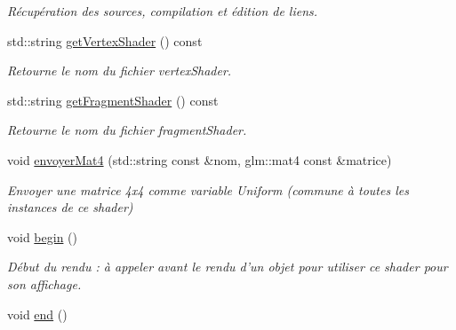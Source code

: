 \begin{DoxyCompactItemize}
\begin{DoxyCompactList}\small\item\em Récupération des sources, compilation et édition de liens. \end{DoxyCompactList}\item 
\hypertarget{classShader_aaa2ce3b8edbb1954b0b627dcb40cff7e}{std\-::string \hyperlink{classShader_aaa2ce3b8edbb1954b0b627dcb40cff7e}{get\-Vertex\-Shader} () const }\label{classShader_aaa2ce3b8edbb1954b0b627dcb40cff7e}

\begin{DoxyCompactList}\small\item\em Retourne le nom du fichier vertex\-Shader. \end{DoxyCompactList}\item 
\hypertarget{classShader_ac5069963469dcac0be6841e73de29aa3}{std\-::string \hyperlink{classShader_ac5069963469dcac0be6841e73de29aa3}{get\-Fragment\-Shader} () const }\label{classShader_ac5069963469dcac0be6841e73de29aa3}

\begin{DoxyCompactList}\small\item\em Retourne le nom du fichier fragment\-Shader. \end{DoxyCompactList}\item 
\hypertarget{classShader_a7caa048bcdc688aba0c691f56bd4c194}{void \hyperlink{classShader_a7caa048bcdc688aba0c691f56bd4c194}{envoyer\-Mat4} (std\-::string const \&nom, glm\-::mat4 const \&matrice)}\label{classShader_a7caa048bcdc688aba0c691f56bd4c194}

\begin{DoxyCompactList}\small\item\em Envoyer une matrice 4x4 comme variable Uniform (commune à toutes les instances de ce shader) \end{DoxyCompactList}\item 
\hypertarget{classShader_acf2af4edd5d98c008b9fd2de3a55c5cf}{void \hyperlink{classShader_acf2af4edd5d98c008b9fd2de3a55c5cf}{begin} ()}\label{classShader_acf2af4edd5d98c008b9fd2de3a55c5cf}

\begin{DoxyCompactList}\small\item\em Début du rendu \-: à appeler avant le rendu d'un objet pour utiliser ce shader pour son affichage. \end{DoxyCompactList}\item 
\hypertarget{classShader_abfff82b6778a0b6d1f1a599b1b306b1d}{void \hyperlink{classShader_abfff82b6778a0b6d1f1a599b1b306b1d}{end} ()}\label{classShader_abfff82b6778a0b6d1f1a599b1b306b1d}


\end{DoxyCompactItemize}
